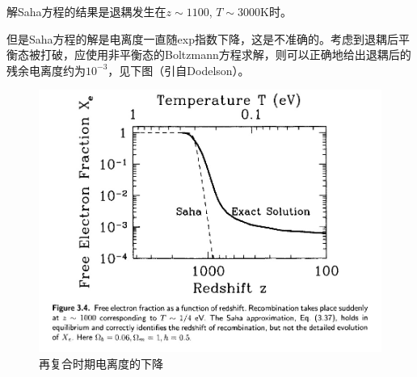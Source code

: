 \documentclass[12pt]{ctexart}
\begin{document}
解Saha方程的结果是退耦发生在$z\sim 1100$, $T\sim 3000\mathrm{K}$时。

但是Saha方程的解是电离度一直随exp指数下降，这是不准确的。考虑到退耦后平衡态被打破，应使用非平衡态的Boltzmann方程求解，则可以正确地给出退耦后的残余电离度约为$10^{-3}$，见下图（引自Dodelson）。
\begin{figure}[!hbtp]
	\centering
	\includegraphics[width=1.0\linewidth]{recombination.jpg}
	\caption{再复合时期电离度的下降} 
\end{figure}
\end{document}
